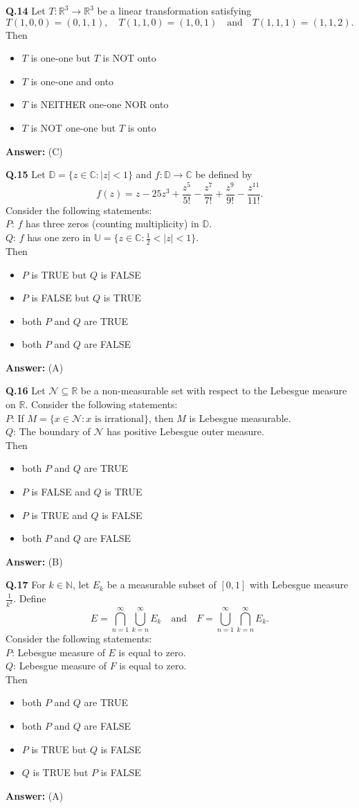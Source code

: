 \documentclass[11pt,a4paper]{article}
\newcommand{\optslistA}[4]{%
  \begin{itemize}
    \setlength{\itemsep}{2pt}\setlength{\parskip}{0pt}
    \item[(A)] #1
    \item[(B)] #2
    \item[(C)] #3
    \item[(D)] #4
  \end{itemize}%
}
\newcommand{\ans}[1]{\textbf{Answer:} #1\par\medskip}
\begin{document}
\textbf{Q.14} Let $T : \mathbb{R}^3 \to \mathbb{R}^3$ be a linear transformation satisfying
\[
  T(1, 0, 0) = (0, 1, 1), \quad T(1, 1, 0) = (1, 0, 1) \quad \text{and} \quad T(1, 1, 1) = (1, 1, 2).
\]
Then
\optslistA{$T$ is one-one but $T$ is NOT onto}{$T$ is one-one and onto}{$T$ is NEITHER one-one NOR onto}{$T$ is NOT one-one but $T$ is onto}
\ans{(C)}

\textbf{Q.15} Let $\mathbb{D} = \{z \in \mathbb{C} : |z| < 1\}$ and $f : \mathbb{D} \to \mathbb{C}$ be defined by
\[
  f(z) = z - 25z^3 + \frac{z^5}{5!} - \frac{z^7}{7!} + \frac{z^9}{9!} - \frac{z^{11}}{11!}.
\]
Consider the following statements:\\
$P$: $f$ has three zeros (counting multiplicity) in $\mathbb{D}$.\\
$Q$: $f$ has one zero in $\mathbb{U} = \{z \in \mathbb{C} : \frac{1}{2} < |z| < 1\}$.\\
Then
\optslistA{$P$ is TRUE but $Q$ is FALSE}{$P$ is FALSE but $Q$ is TRUE}{both $P$ and $Q$ are TRUE}{both $P$ and $Q$ are FALSE}
\ans{(A)}

\textbf{Q.16} Let $\mathcal{N} \subseteq \mathbb{R}$ be a non-measurable set with respect to the Lebesgue measure on $\mathbb{R}$. Consider the following statements:\\
$P$: If $M = \{x \in \mathcal{N} : x \text{ is irrational}\}$, then $M$ is Lebesgue measurable.\\
$Q$: The boundary of $\mathcal{N}$ has positive Lebesgue outer measure.\\
Then
\optslistA{both $P$ and $Q$ are TRUE}{$P$ is FALSE and $Q$ is TRUE}{$P$ is TRUE and $Q$ is FALSE}{both $P$ and $Q$ are FALSE}
\ans{(B)}

\textbf{Q.17} For $k \in \mathbb{N}$, let $E_k$ be a measurable subset of $[0, 1]$ with Lebesgue measure $\frac{1}{k^2}$. Define
\[
  E = \bigcap_{n=1}^{\infty} \bigcup_{k=n}^{\infty} E_k \quad \text{and} \quad F = \bigcup_{n=1}^{\infty} \bigcap_{k=n}^{\infty} E_k.
\]
Consider the following statements:\\
$P$: Lebesgue measure of $E$ is equal to zero.\\
$Q$: Lebesgue measure of $F$ is equal to zero.\\
Then
\optslistA{both $P$ and $Q$ are TRUE}{both $P$ and $Q$ are FALSE}{$P$ is TRUE but $Q$ is FALSE}{$Q$ is TRUE but $P$ is FALSE}
\ans{(A)}
\end{document}
